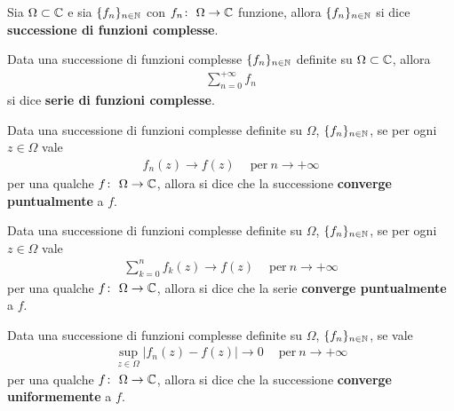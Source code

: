 \begin{definition}
	\label{defn:successione-di-funzioni-complesse}
	Sia $\Omega \subset \mathbb{C}$ e sia $\{f_n\}_{n\in\mathbb{N}}$ con $f_n \colon\ \Omega \rightarrow \mathbb{C}$ funzione, allora $\{f_n\}_{n\in\mathbb{N}}$ si dice \textbf{successione di funzioni complesse}.
\end{definition}

\begin{definition}
	\label{defn:serie-di-funzioni-complesse}
	Data una successione di funzioni complesse $\{f_n\}_{n\in\mathbb{N}}$ definite su $\Omega\subset\mathbb{C}$, allora 
	\begin{equation}
	\begin{aligned}
		\sum_{n=0}^{+\infty} f_n 
	\end{aligned}
	\end{equation}
	si dice \textbf{serie di funzioni complesse}.
\end{definition}

\begin{definition}
	\label{defn:convergenza-puntuale-successione}
	Data una successione di funzioni complesse definite su $\Omega$, $\{f_n\}_{n\in\mathbb{N}}$, se per ogni $z \in \Omega$ vale 
	\begin{equation}
	\begin{aligned}
		f_n(z) \to f(z) \quad\ \text{per}\ n \to +\infty
	\end{aligned}
	\end{equation}
	per una qualche $f \colon\ \Omega \rightarrow \mathbb{C}$, allora si dice che la successione \textbf{converge puntualmente} a $f$.
\end{definition}

\begin{definition}
	\label{defn:convergenza-puntuale-serie}
	Data una successione di funzioni complesse definite su $\Omega$, $\{f_n\}_{n\in\mathbb{N}}$, se per ogni $z \in \Omega$ vale 
	\begin{equation}
	\begin{aligned}
		\sum^{n}_{k=0} f_k(z) \to f(z) \quad\ \text{per}\ n \to +\infty
	\end{aligned}
	\end{equation}
	per una qualche $f \colon\ \Omega \rightarrow \mathbb{C}$, allora si dice che la serie \textbf{converge puntualmente} a $f$.
\end{definition}

\begin{definition}
	\label{defn:convergenza-uniforme-successione}
	Data una successione di funzioni complesse definite su $\Omega$, $\{f_n\}_{n\in\mathbb{N}}$, se vale 
	\begin{equation}
	\begin{aligned}
		\sup_{z \in \Omega} |f_n(z) - f(z)| \to 0 \quad\ \text{per}\ n \to +\infty
	\end{aligned}
	\end{equation}
	per una qualche $f \colon\ \Omega \rightarrow \mathbb{C}$, allora si dice che la successione \textbf{converge uniformemente} a $f$.
\end{definition}

